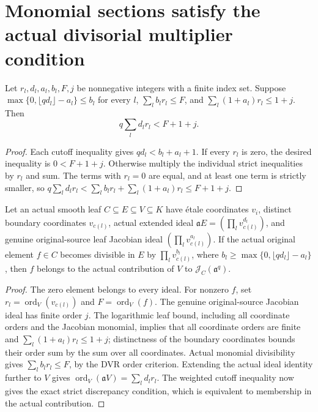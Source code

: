\section{Monomial sections satisfy the actual divisorial multiplier condition}

\begin{lemma}\label{lem:sc0-weighted-strict-multiplier-cutoff}
\leanok
{}
Let $r_l,d_l,a_l,b_l,F,j$ be nonnegative integers with a finite index set.
Suppose $\max\{0,\lfloor qd_l\rfloor-a_l\}\le b_l$ for every $l$,
$\sum_l b_lr_l\le F$, and
$\sum_l(1+a_l)r_l\le1+j$. Then
\[
 q\sum_l d_lr_l<F+1+j.
\]
\end{lemma}
\begin{proof}
Each cutoff inequality gives $qd_l<b_l+a_l+1$. If every $r_l$ is zero,
the desired inequality is $0<F+1+j$. Otherwise multiply the individual
strict inequalities by $r_l$ and sum. The terms with $r_l=0$ are equal,
and at least one term is strictly smaller, so
$q\sum_l d_lr_l<\sum_l b_lr_l+\sum_l(1+a_l)r_l\le F+1+j$.
\end{proof}

\begin{theorem}\label{thm:sc0-leaf-monomial-multiplier-membership}
\leanok
{}
Let an actual smooth leaf $C\subseteq E\subseteq V\subseteq K$ have
\'etale coordinates $v_i$, distinct boundary coordinates $v_{c(l)}$, actual
extended ideal $\mathfrak a E=(\prod_l v_{c(l)}^{d_l})$, and genuine
original-source leaf Jacobian ideal $(\prod_l v_{c(l)}^{a_l})$.
If the actual original element $f\in C$ becomes divisible in $E$ by
$\prod_l v_{c(l)}^{b_l}$, where
$b_l\ge\max\{0,\lfloor qd_l\rfloor-a_l\}$, then $f$ belongs to the
actual contribution of $V$ to $\mathcal J_C(\mathfrak a^q)$.
\end{theorem}
\begin{proof}
The zero element belongs to every ideal. For nonzero $f$, set
$r_l=\operatorname{ord}_V(v_{c(l)})$ and $F=\operatorname{ord}_V(f)$.
The genuine original-source Jacobian ideal has finite order $j$.
The logarithmic leaf bound, including all coordinate orders and the
Jacobian monomial, implies that all coordinate orders are finite and
$\sum_l(1+a_l)r_l\le1+j$; distinctness of the boundary coordinates
bounds their order sum by the sum over all coordinates. Actual
monomial divisibility gives $\sum_l b_lr_l\le F$, by the DVR
order criterion. Extending the actual ideal identity further to $V$
gives $\operatorname{ord}_V(\mathfrak aV)=\sum_l d_lr_l$.
The weighted cutoff inequality now gives the exact strict discrepancy
condition, which is equivalent to membership in the actual contribution.
\end{proof}
